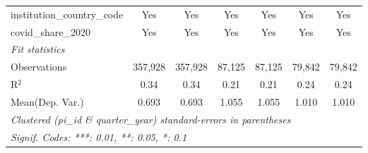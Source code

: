 \begin{tabular}{lcccccc}
   institution\_country\_code                                  & Yes           & Yes           & Yes           & Yes            & Yes           & Yes\\  
   covid\_share\_2020                                          & Yes           & Yes           & Yes           & Yes            & Yes           & Yes\\  
   \midrule
   \emph{Fit statistics}\\
   Observations                                                & 357,928       & 357,928       & 87,125        & 87,125         & 79,842        & 79,842\\  
   R$^2$                                                       & 0.34          & 0.34          & 0.21          & 0.21           & 0.24          & 0.24\\  
Mean(Dep. Var.) & 0.693 & 0.693 & 1.055 & 1.055 & 1.010 & 1.010 \\
   \midrule \midrule
   \multicolumn{7}{l}{\emph{Clustered (pi\_id \& quarter\_year) standard-errors in parentheses}}\\
   \multicolumn{7}{l}{\emph{Signif. Codes: ***: 0.01, **: 0.05, *: 0.1}}\\
\end{tabular}
\par\endgroup
